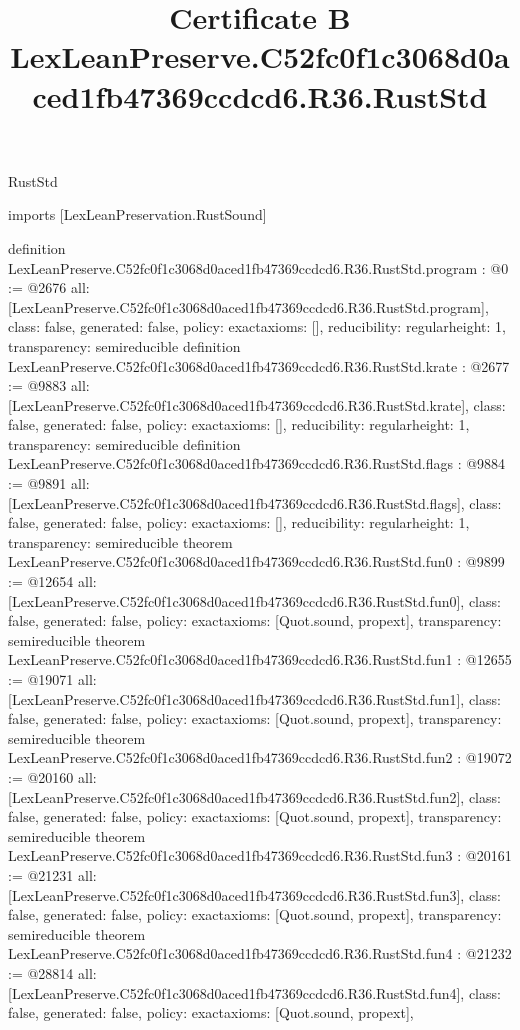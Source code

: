 \begin{lexlean}{RustStd}
\title{Certificate B LexLeanPreserve.C52fc0f1c3068d0aced1fb47369ccdcd6.R36.RustStd}
\begin{coremodule}
imports [LexLeanPreservation.RustSound]

definition LexLeanPreserve.C52fc0f1c3068d0aced1fb47369ccdcd6.R36.RustStd.program : @0 := @2676 {
  all: [LexLeanPreserve.C52fc0f1c3068d0aced1fb47369ccdcd6.R36.RustStd.program],
  class: false,
  generated: false,
  policy: exact{axioms: []},
  reducibility: regular{height: 1},
  transparency: semireducible
}
definition LexLeanPreserve.C52fc0f1c3068d0aced1fb47369ccdcd6.R36.RustStd.krate : @2677 := @9883 {
  all: [LexLeanPreserve.C52fc0f1c3068d0aced1fb47369ccdcd6.R36.RustStd.krate],
  class: false,
  generated: false,
  policy: exact{axioms: []},
  reducibility: regular{height: 1},
  transparency: semireducible
}
definition LexLeanPreserve.C52fc0f1c3068d0aced1fb47369ccdcd6.R36.RustStd.flags : @9884 := @9891 {
  all: [LexLeanPreserve.C52fc0f1c3068d0aced1fb47369ccdcd6.R36.RustStd.flags],
  class: false,
  generated: false,
  policy: exact{axioms: []},
  reducibility: regular{height: 1},
  transparency: semireducible
}
theorem LexLeanPreserve.C52fc0f1c3068d0aced1fb47369ccdcd6.R36.RustStd.fun0 : @9899 := @12654 {
  all: [LexLeanPreserve.C52fc0f1c3068d0aced1fb47369ccdcd6.R36.RustStd.fun0],
  class: false,
  generated: false,
  policy: exact{axioms: [Quot.sound, propext]},
  transparency: semireducible
}
theorem LexLeanPreserve.C52fc0f1c3068d0aced1fb47369ccdcd6.R36.RustStd.fun1 : @12655 := @19071 {
  all: [LexLeanPreserve.C52fc0f1c3068d0aced1fb47369ccdcd6.R36.RustStd.fun1],
  class: false,
  generated: false,
  policy: exact{axioms: [Quot.sound, propext]},
  transparency: semireducible
}
theorem LexLeanPreserve.C52fc0f1c3068d0aced1fb47369ccdcd6.R36.RustStd.fun2 : @19072 := @20160 {
  all: [LexLeanPreserve.C52fc0f1c3068d0aced1fb47369ccdcd6.R36.RustStd.fun2],
  class: false,
  generated: false,
  policy: exact{axioms: [Quot.sound, propext]},
  transparency: semireducible
}
theorem LexLeanPreserve.C52fc0f1c3068d0aced1fb47369ccdcd6.R36.RustStd.fun3 : @20161 := @21231 {
  all: [LexLeanPreserve.C52fc0f1c3068d0aced1fb47369ccdcd6.R36.RustStd.fun3],
  class: false,
  generated: false,
  policy: exact{axioms: [Quot.sound, propext]},
  transparency: semireducible
}
theorem LexLeanPreserve.C52fc0f1c3068d0aced1fb47369ccdcd6.R36.RustStd.fun4 : @21232 := @28814 {
  all: [LexLeanPreserve.C52fc0f1c3068d0aced1fb47369ccdcd6.R36.RustStd.fun4],
  class: false,
  generated: false,
  policy: exact{axioms: [Quot.sound, propext]},
}
\end{coremodule}
\end{lexlean}

